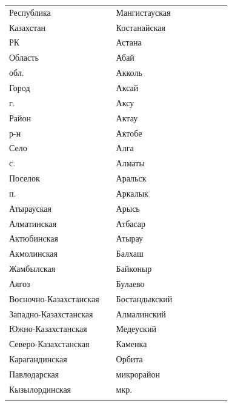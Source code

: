 \documentclass[12pt, a4paper]{article}
\begin{document}
\begin{figure}[t]
\scriptsize 
\begin{tabular}[b]{ V{2.8} m{2.0cm} V{2.8} m{6.2cm} V{2.8} m{2.0cm} V{2.8}  m{8.0cm }V{2.8}} 
Республика &  & Мангистауская &  \\ [0.45cm]
Казахстан &  & Костанайская &  \\ [0.45cm]
РК &  & Астана &  \\ [0.45cm]
Область &  & Абай &  \\ [0.45cm]
обл. &  & Акколь &  \\ [0.45cm]
Город &  & Аксай &  \\ [0.45cm]
г. &  & Аксу &  \\ [0.45cm]
Район &  & Актау &  \\ [0.45cm]
р-н &  & Актобе &  \\ [0.45cm]
Село &  & Алга &  \\ [0.45cm]
с. &  & Алматы &  \\ [0.45cm]
Поселок &  & Аральск &  \\ [0.45cm]
п. &  & Аркалык &  \\ [0.45cm]
Атырауская &  & Арысь &  \\ [0.45cm]
Алматинская &  & Атбасар &  \\ [0.45cm]
Актюбинская &  & Атырау &  \\ [0.45cm]
Акмолинская &  & Балхаш &  \\ [0.45cm]
Жамбылская &  & Байконыр &  \\ [0.45cm]
Аягоз &  & Булаево &  \\ [0.45cm]
Восночно-Казахстанская &  & Бостандыкский  &  \\ [0.45cm]
Западно-Казахстанская &  & Алмалинский &  \\ [0.45cm]
Южно-Казахстанская &  & Медеуский &  \\ [0.45cm]
Северо-Казахстанская &  & Каменка &  \\ [0.45cm]
Карагандинская &  & Орбита &  \\ [0.45cm]
Павлодарская &  & микрорайон &  \\ [0.45cm]
Кызылординская &  & мкр. &  \\ [0.45cm]
\end{tabular}
\end{figure}
\end{document}
